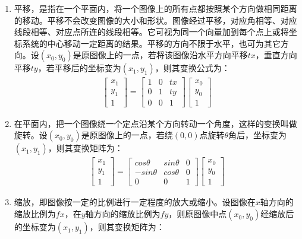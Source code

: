 \begin{enumerate}
\item 平移，是指在一个平面内，将一个图像上的所有点都按照某个方向做相同距离的移动。平移不会改变图像的大小和形状。图像经过平移，对应角相等、对应线段相等、对应点所连的线段相等。它可视为同一个向量加到每个点上或将坐标系统的中心移动一定距离的结果。平移的方向不限于水平，也可为其它方向。设$(x_0,y_0)$是原图像上的一点，若将该图像沿水平方向平移$tx$，垂直方向平移$ty$，若平移后的坐标变为$(x_1,y_1)$，则其变换公式为：
\begin{align}
\left[ \begin{array}{c}
x_1 \\
y_1 \\
1   
\end{array} \right]
=
\left[ \begin{array}{ccc}
1 & 0 & tx \\
0 & 1 & ty \\
0 & 0 & 1
\end{array} \right]
\left[ \begin{array}{c}
x_0 \\
y_0 \\
1
\end{array} \right]
\end{align}
\item 在平面内，把一个图像绕一个定点沿某个方向转动一个角度，这样的变换叫做旋转。设$(x_0,y_0)$是原图像上的一点，若绕$(0, 0)$点旋转$\theta$角后，坐标变为$(x_1,y_1)$，则其变换矩阵为：
\begin{align}
\left[ \begin{array}{c}
x_1 \\
y_1 \\
1   
\end{array} \right]
=
\left[ \begin{array}{ccc}
cos\theta & sin\theta & 0 \\
-sin\theta & cos\theta & 0 \\
0 & 0 & 1
\end{array} \right]
\left[ \begin{array}{c}
x_0 \\
y_0 \\
1
\end{array} \right]
\end{align}
\item 缩放，即图像按一定的比例进行一定程度的放大或缩小。设图像在$x$轴方向的缩放比例为$fx$，在$y$轴方向的缩放比例为$fy$，则原图像中点$(x_0, y_0)$经缩放后的坐标变为$(x_1, y_1)$，则其变换矩阵为：


\end{enumerate}
